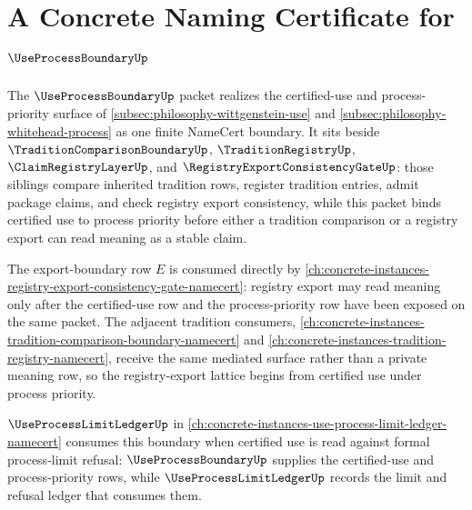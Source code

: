\chapter{A Concrete Naming Certificate for $\UseProcessBoundaryUp$}
\label{ch:concrete-instances-use-process-boundary-namecert}

The $\UseProcessBoundaryUp$ packet realizes the certified-use and process-priority surface of \autoref{subsec:philosophy-wittgenstein-use} and \autoref{subsec:philosophy-whitehead-process} as one finite NameCert boundary. It sits beside $\TraditionComparisonBoundaryUp$, $\TraditionRegistryUp$, $\ClaimRegistryLayerUp$, and $\RegistryExportConsistencyGateUp$: those siblings compare inherited tradition rows, register tradition entries, admit package claims, and check registry export consistency, while this packet binds certified use to process priority before either a tradition comparison or a registry export can read meaning as a stable claim.

The export-boundary row $E$ is consumed directly by \autoref{ch:concrete-instances-registry-export-consistency-gate-namecert}: registry export may read meaning only after the certified-use row and the process-priority row have been exposed on the same packet. The adjacent tradition consumers, \autoref{ch:concrete-instances-tradition-comparison-boundary-namecert} and \autoref{ch:concrete-instances-tradition-registry-namecert}, receive the same mediated surface rather than a private meaning row, so the registry-export lattice begins from certified use under process priority.

$\UseProcessLimitLedgerUp$ in \autoref{ch:concrete-instances-use-process-limit-ledger-namecert} consumes this boundary when certified use is read against formal process-limit refusal: $\UseProcessBoundaryUp$ supplies the certified-use and process-priority rows, while $\UseProcessLimitLedgerUp$ records the limit and refusal ledger that consumes them.

